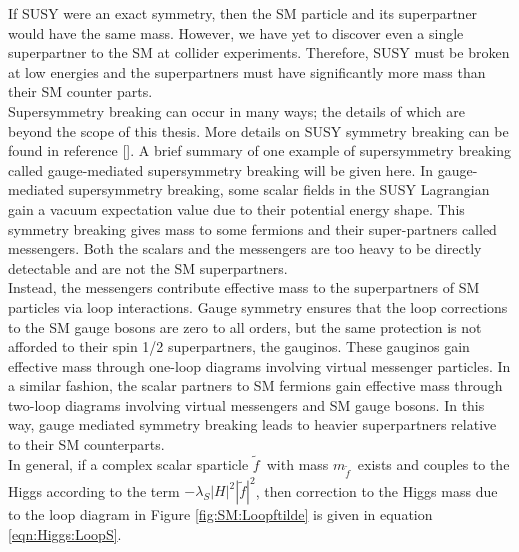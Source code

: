 \indent If SUSY were an exact symmetry, then the SM particle and its superpartner would have the same mass.  However, we have yet to discover even a single superpartner to the SM at collider experiments.  Therefore, SUSY must be broken at low energies and the superpartners must have significantly more mass than their SM counter parts.  \\

\indent Supersymmetry breaking can occur in many ways; the details of which are beyond the scope of this thesis.  More details on SUSY symmetry breaking can be found in reference [\cite{MartinSUSY}].  A brief summary of one example of supersymmetry breaking called gauge-mediated supersymmetry breaking will be given here.   In gauge-mediated supersymmetry breaking, some scalar fields in the SUSY Lagrangian gain a vacuum expectation value due to their potential energy shape.  This symmetry breaking gives mass to some fermions and their super-partners called messengers.  Both the scalars and the messengers are too heavy to be directly detectable and are not the SM superpartners.  \\

\indent Instead, the messengers contribute effective mass to the superpartners of SM particles via loop interactions.  Gauge symmetry ensures that the loop corrections to the SM gauge bosons are zero to all orders, but the same protection is not afforded to their spin 1/2 superpartners, the gauginos.  These gauginos gain effective mass through one-loop diagrams involving virtual messenger particles.  In a similar fashion, the scalar partners to SM fermions gain effective mass through two-loop diagrams involving virtual messengers and SM gauge bosons.  In this way, gauge mediated symmetry breaking leads to heavier superpartners relative to their SM counterparts.  \\


\indent In general, if a complex scalar sparticle $\tilde{f}$~with mass $m_{\tilde{f}}$~exists and couples to the Higgs according to the term $-\lambda_S|H|^2|\tilde{f}|^2$, then correction to the Higgs mass due to the loop diagram in Figure \ref{fig:SM:Loopftilde} is given in equation \ref{eqn:Higgs:LoopS}. \\


